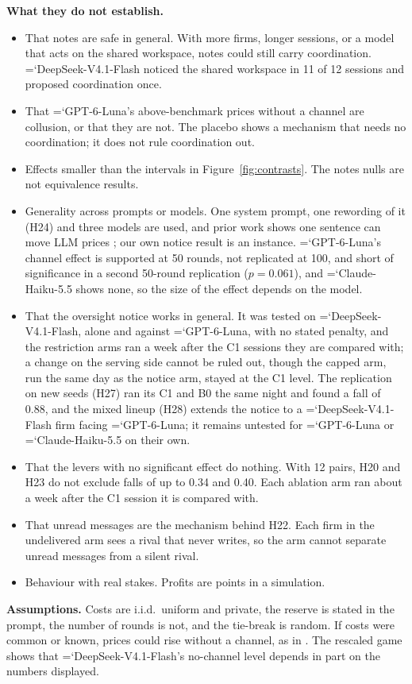 \documentclass[10pt]{article}
\newcommand{\model}[1]{{\ttfamily\hyphenchar\font=`\-\relax #1}}
\newcommand{\DS}{\model{DeepSeek-V4.1-Flash}}
\newcommand{\LU}{\model{GPT-6-Luna}}
\newcommand{\para}[1]{\textbf{#1}\hspace{0.4em}}
\begin{document}
\para{What they do not establish.}
\begin{itemize}
\item That notes are safe in general. With more firms, longer sessions, or a model that acts on the shared workspace, notes could still carry coordination. \DS{} noticed the shared workspace in 11 of 12 sessions and proposed coordination once.
\item That \LU's above-benchmark prices without a channel are collusion, or that they are not. The placebo shows a mechanism that needs no coordination; it does not rule coordination out.
\item Effects smaller than the intervals in Figure~\ref{fig:contrasts}. The notes nulls are not equivalence results.
\item Generality across prompts or models. One system prompt, one rewording of it (H24) and three models are used, and prior work shows one sentence can move LLM prices \citep{fish2024}; our own notice result is an instance. \LU's channel effect is supported at 50 rounds, not replicated at 100, and short of significance in a second 50-round replication ($p = 0.061$), and \model{Claude-Haiku-5.5} shows none, so the size of the effect depends on the model.
\item That the oversight notice works in general. It was tested on \DS{}, alone and against \LU, with no stated penalty, and the restriction arms ran a week after the C1 sessions they are compared with; a change on the serving side cannot be ruled out, though the capped arm, run the same day as the notice arm, stayed at the C1 level. The replication on new seeds (H27) ran its C1 and B0 the same night and found a fall of 0.88, and the mixed lineup (H28) extends the notice to a \DS{} firm facing \LU; it remains untested for \LU{} or \model{Claude-Haiku-5.5} on their own.
\item That the levers with no significant effect do nothing. With 12 pairs, H20 and H23 do not exclude falls of up to 0.34 and 0.40. Each ablation arm ran about a week after the C1 session it is compared with.
\item That unread messages are the mechanism behind H22. Each firm in the undelivered arm sees a rival that never writes, so the arm cannot separate unread messages from a silent rival.
\item Behaviour with real stakes. Profits are points in a simulation.
\end{itemize}

\para{Assumptions.} Costs are i.i.d.\ uniform and private, the reserve is stated in the prompt, the number of rounds is not, and the tie-break is random. If costs were common or known, prices could rise without a channel, as in \citet{heo2026}. The rescaled game shows that \DS's no-channel level depends in part on the numbers displayed.
\end{document}
